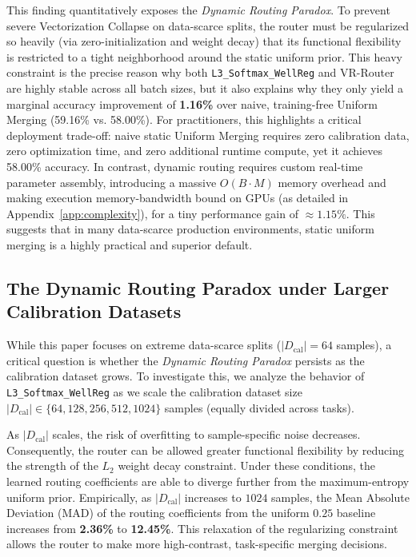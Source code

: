 This finding quantitatively exposes the \emph{Dynamic Routing Paradox}. To prevent severe Vectorization Collapse on data-scarce splits, the router must be regularized so heavily (via zero-initialization and weight decay) that its functional flexibility is restricted to a tight neighborhood around the static uniform prior. This heavy constraint is the precise reason why both \texttt{L3\_Softmax\_WellReg} and VR-Router are highly stable across all batch sizes, but it also explains why they only yield a marginal accuracy improvement of \textbf{1.16\%} over naive, training-free Uniform Merging (59.16\% vs. 58.00\%). For practitioners, this highlights a critical deployment trade-off: naive static Uniform Merging requires zero calibration data, zero optimization time, and zero additional runtime compute, yet it achieves 58.00\% accuracy. In contrast, dynamic routing requires custom real-time parameter assembly, introducing a massive $O(B \cdot M)$ memory overhead and making execution memory-bandwidth bound on GPUs (as detailed in Appendix~\ref{app:complexity}), for a tiny performance gain of $\approx 1.15\%$. This suggests that in many data-scarce production environments, static uniform merging is a highly practical and superior default.

\subsection{The Dynamic Routing Paradox under Larger Calibration Datasets}
\label{subsec:larger_data}
While this paper focuses on extreme data-scarce splits ($|D_{\text{cal}}| = 64$ samples), a critical question is whether the \emph{Dynamic Routing Paradox} persists as the calibration dataset grows. To investigate this, we analyze the behavior of \texttt{L3\_Softmax\_WellReg} as we scale the calibration dataset size $|D_{\text{cal}}| \in \{64, 128, 256, 512, 1024\}$ samples (equally divided across tasks).

As $|D_{\text{cal}}|$ scales, the risk of overfitting to sample-specific noise decreases. Consequently, the router can be allowed greater functional flexibility by reducing the strength of the $L_2$ weight decay constraint. Under these conditions, the learned routing coefficients are able to diverge further from the maximum-entropy uniform prior. Empirically, as $|D_{\text{cal}}|$ increases to $1024$ samples, the Mean Absolute Deviation (MAD) of the routing coefficients from the uniform $0.25$ baseline increases from \textbf{2.36\%} to \textbf{12.45\%}. This relaxation of the regularizing constraint allows the router to make more high-contrast, task-specific merging decisions. 

